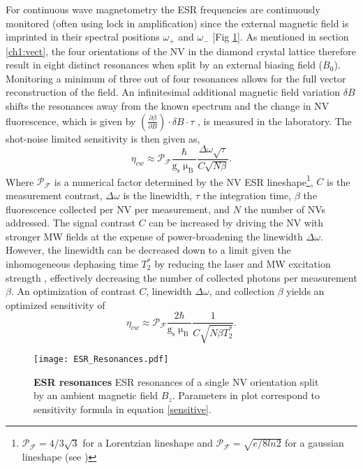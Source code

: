 For continuous wave magnetometry the ESR frequencies are continuously monitored (often using lock in amplification) since the external magnetic field is imprinted in their spectral positions $\omega_+$ and $\omega_-$ [Fig \ref{ESRfreq}]. As mentioned in section \ref{ch1:vect}, the four orientations of the NV in the diamond crystal lattice therefore result in eight distinct resonances when split by an external biasing field ($B_0$). Monitoring a minimum of three out of four resonances allows for the full vector reconstruction of the field. An infinitesimal additional magnetic field variation $\delta B$ shifts the resonances away from the known spectrum and the change in NV fluorescence, which is given by $\left(\frac{\partial \beta}{\partial B}\right) \cdot \delta B \cdot \tau$ \cite{rondin2014magnetometry}, is measured in the laboratory. The shot-noise limited sensitivity is then given as,
\begin{equation} \label{sensitive}
\eta_{cw} \approx \mathcal{P}_\mathcal{F}\frac{\hbar}{\text{g}_\text{s} \upmu_\text{B}} \frac{\Delta \omega \sqrt{\tau}}{C\sqrt{N \beta}}. 
\end{equation}
Where $\mathcal{P}_{\mathcal{F}}$ is a numerical factor determined by the NV ESR lineshape\footnote{$\mathcal{P}_\mathcal{F} = 4/3\sqrt{3}$ for a Lorentzian lineshape and $\mathcal{P}_\mathcal{F} = \sqrt{e/8ln2}$ for a gaussian lineshape (see \cite{pham2013magnetic})}, $C$ is the measurement contrast, $\Delta \omega$ is the linewidth, $\tau$ the integration time, $\beta$ the fluorescence collected per NV per measurement, and $N$ the number of NVs addressed.
The signal contrast $C$ can be increased by driving the NV with stronger MW fields at the expense of power-broadening the linewidth $\Delta \omega$. However, the linewidth can be decreased down to a limit given the inhomogeneous dephasing time $T_2^*$ by reducing the laser and MW excitation strength \cite{dreau2011avoiding}, effectively decreasing the number of collected photons per measurement $\beta$. An optimization of contrast $C$, linewidth $\Delta \omega$, and collection $\beta$ yields an optimized sensitivity of \cite{pham2013magnetic}
\begin{equation}
\eta_{cw} \approx  \mathcal{P}_\mathcal{F}\frac{2\hbar}{\text{g}_\text{s} \upmu_\text{B}} \frac{1}{C\sqrt{N \beta T_2^*}}.
\end{equation}

\begin{figure}[t!]
\centering
\texttt{[image: ESR\_Resonances.pdf]}  
\caption{\textbf{ESR resonances} ESR resonances of a single NV orientation split by an ambient magnetic field $B_z$. Parameters in plot correspond to sensitivity formula in equation \ref{sensitive}.}
\label{ESRfreq}
\end{figure}


